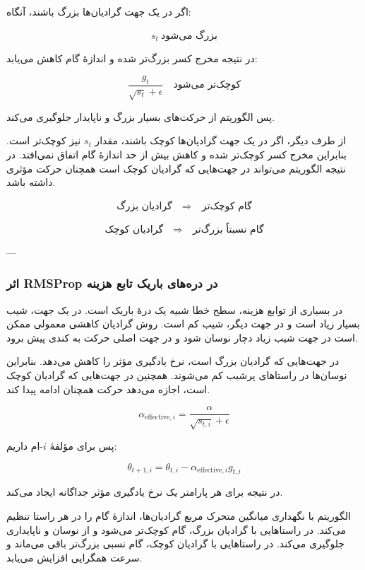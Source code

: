 \documentclass[12pt,a4paper]{article}
\begin{document}
اگر در یک جهت گرادیان‌ها بزرگ باشند، آنگاه:

\[
s_t \ \text{بزرگ می‌شود}
\]

در نتیجه مخرج کسر بزرگ‌تر شده و اندازهٔ گام کاهش می‌یابد:

\[
\frac{g_t}{\sqrt{s_t}+\epsilon}
\quad \text{کوچک‌تر می‌شود}
\]

پس الگوریتم از حرکت‌های بسیار بزرگ و ناپایدار جلوگیری می‌کند.

از طرف دیگر، اگر در یک جهت گرادیان‌ها کوچک باشند، مقدار \(s_t\) نیز کوچک‌تر است. بنابراین مخرج کسر کوچک‌تر شده و کاهش بیش از حد اندازهٔ گام اتفاق نمی‌افتد. در نتیجه الگوریتم می‌تواند در جهت‌هایی که گرادیان کوچک است همچنان حرکت مؤثری داشته باشد.

\[
\text{گرادیان بزرگ}
\quad \Longrightarrow \quad
\text{گام کوچک‌تر}
\]

\[
\text{گرادیان کوچک}
\quad \Longrightarrow \quad
\text{گام نسبتاً بزرگ‌تر}
\]

---

\subsubsection{اثر RMSProp در دره‌های باریک تابع هزینه}

در بسیاری از توابع هزینه، سطح خطا شبیه یک درهٔ باریک است. در یک جهت، شیب بسیار زیاد است و در جهت دیگر، شیب کم است. روش گرادیان کاهشی معمولی ممکن است در جهت شیب زیاد دچار نوسان شود و در جهت اصلی حرکت به کندی پیش برود.

 در جهت‌هایی که گرادیان بزرگ است، نرخ یادگیری مؤثر را کاهش می‌دهد. بنابراین نوسان‌ها در راستاهای پرشیب کم می‌شوند. همچنین در جهت‌هایی که گرادیان کوچک است، اجازه می‌دهد حرکت همچنان ادامه پیدا کند.

\[
\alpha_{\text{effective},i}
=
\frac{\alpha}{\sqrt{s_{t,i}}+\epsilon}
\]

پس برای مؤلفهٔ \(i\)-ام داریم:

\[
\theta_{t+1,i}
=
\theta_{t,i}
-
\alpha_{\text{effective},i} g_{t,i}
\]

در نتیجه  برای هر پارامتر یک نرخ یادگیری مؤثر جداگانه ایجاد می‌کند.

\begin{tcolorbox}[
	colback=softgreen,
	colframe=mygreen,
	title=جمع‌بندی بخش RMSProp
	]
	الگوریتم  با نگهداری میانگین متحرک مربع گرادیان‌ها، اندازهٔ گام را در هر راستا تنظیم می‌کند. در راستاهایی با گرادیان بزرگ، گام کوچک‌تر می‌شود و از نوسان و ناپایداری جلوگیری می‌کند. در راستاهایی با گرادیان کوچک، گام نسبی بزرگ‌تر باقی می‌ماند و سرعت همگرایی افزایش می‌یابد.
\end{tcolorbox}
\end{document}
